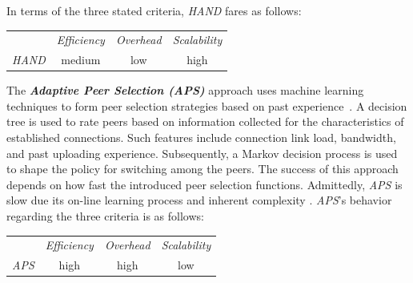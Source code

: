 In terms of the three stated criteria, \emph{HAND} fares as follows:
\begin{center}
{\footnotesize
\begin{tabular}{rccc}
\multicolumn{1}{r}{} &
\multicolumn{1}{c}{\emph{Efficiency}} &
\multicolumn{1}{c}{\emph{Overhead}} &
\multicolumn{1}{c}{\emph{Scalability}}
\\
\cline{2-4}
\emph{HAND} &
medium &
low &
high
\end{tabular}
}
\end{center}

The \textbf{\emph{Adaptive Peer Selection (APS)}} approach uses 
machine learning techniques to form peer selection strategies based on past
experience~\cite{BFLZ2003}. A decision tree is used to rate peers based on
information collected for the characteristics of established connections. Such
features include connection link load, bandwidth, and past uploading experience.
Subsequently, a Markov decision process is used
to shape the policy for switching among the peers. The success of this approach depends on
how fast the introduced peer selection functions. Admittedly, \emph{APS} is slow 
due its on-line learning process and inherent complexity \cite{ZZLZ2009}. 
\emph{APS}'s behavior regarding the three criteria is as follows:
\begin{center}
{\footnotesize
\begin{tabular}{rccc}
\multicolumn{1}{r}{} &
\multicolumn{1}{c}{\emph{Efficiency}} &
\multicolumn{1}{c}{\emph{Overhead}} &
\multicolumn{1}{c}{\emph{Scalability}}
\\
\cline{2-4}
\emph{APS} &
high &
high &
low
\end{tabular}
}
\end{center}

